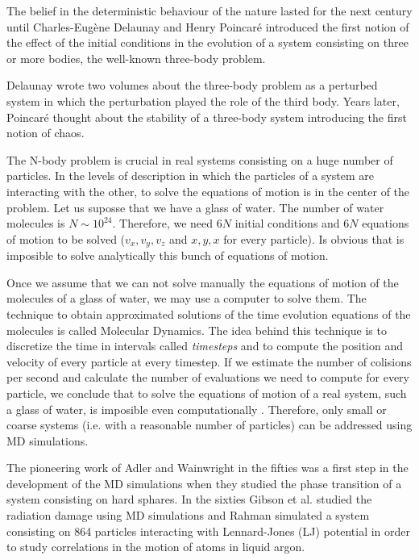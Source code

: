 \documentclass[b5paper,openright,10pt]{book}
\begin{document}
The belief in the deterministic behaviour of the nature lasted for the next century until Charles-Eugène Delaunay and Henry Poincaré introduced the first notion of the effect of the initial conditions in the evolution of a system consisting on three or more bodies, the well-known three-body problem. 

Delaunay wrote two volumes \cite{Delaunay1860} about the three-body problem as a perturbed system in which the perturbation played the role of the third body. 
Years later, Poincaré thought about the stability of a three-body system introducing the first notion of chaos. 

The N-body problem is crucial in real systems consisting on a huge number of particles. In the levels of description in which the particles of a system are interacting with the other, to solve the equations of motion is in the center of the problem. Let us suposse that we have a glass of water. 
The number of water molecules is $N \sim 10^{24}$. Therefore, we need  $6N$ initial conditions and $6N$ equations of motion to be solved ($v_x,v_y,v_z$ and $x,y,x$ for every particle). Is obvious that is imposible to solve analytically this bunch of equations of motion.

Once we assume that we can not solve manually the equations of motion of the molecules of a glass of water, we may use a computer to solve them. 
The technique to obtain approximated solutions of the time evolution equations of the molecules is called Molecular Dynamics.
The idea behind this technique is to discretize the time in intervals called \textit{timesteps} and to compute the position and velocity of every particle at every timestep. If we estimate the number of colisions per second and calculate the number of evaluations we need to compute for every particle, we conclude that to solve the equations of motion of a real system, such a glass of water, is imposible even computationally \cite{TesisArturo}.
Therefore, only small or coarse systems (i.e. with a reasonable number of particles) can be addressed using MD simulations. 

The pioneering work of Adler and Wainwright \cite{Alder1957} in the fifties was a first step in the development of the MD simulations when they studied the phase transition of a system consisting on hard sphares. In the sixties Gibson et al. \cite{Gibson1960} studied the radiation damage using MD simulations and  Rahman \cite{Rahman1964} simulated a system consisting on 864 particles interacting with Lennard-Jones (LJ) potential in order to study correlations in the motion of atoms in liquid argon.  
\end{document}

